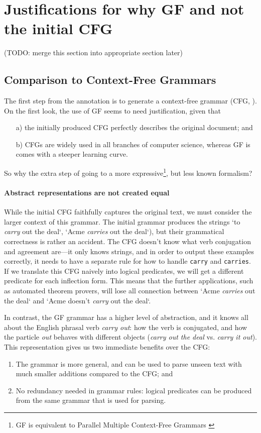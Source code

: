 \documentclass{IOS-Book-Article}
\begin{document}
\section{Justifications for why GF and not the initial CFG}

(TODO: merge this section into appropriate section later)

\subsection{Comparison to Context-Free Grammars}

The first step from the annotation is to generate a context-free grammar (CFG, \cite{chomsky-1956}). On the first look, the use of GF seems to need justification, given that
\begin{enumerate}
\item[a)] the initially produced CFG perfectly describes the original document; and
\item[b)] CFGs are widely used in all branches of computer science, whereas GF is comes with a steeper learning curve.
\end{enumerate}

So why the extra step of going to a more expressive\footnote{GF is equivalent to Parallel Multiple Context-Free Grammars \cite{seki-al-1991}}, but less known formalism?

\paragraph{Abstract representations are not created equal}
While the initial CFG faithfully captures the original text, we must consider the larger context of this grammar.
The initial grammar produces the strings `to \emph{carry} out the deal`, `Acme \emph{carries} out the deal`), but their grammatical correctness is rather an accident.
The CFG doesn't know what verb conjugation and agreement are---it only knows strings, and in order to output these examples correctly, it needs to have a separate rule for how to handle \texttt{carry} and \texttt{carries}. If we translate this CFG naively into logical predicates, we will get a different predicate for each inflection form. This means that the further applications, such as automated theorem provers, will lose all connection between `Acme \emph{carries} out the deal` and `Acme doesn't \emph{carry} out the deal`.

In contrast, the GF grammar has a higher level of abstraction, and it knows all about the English phrasal verb \emph{carry out}: how the verb is conjugated, and how the particle \emph{out} behaves with different objects (\emph{carry out the deal} vs. \emph{carry it out}). This representation gives us two immediate benefits over the CFG:
\begin{enumerate}
\item The grammar is more general, and can be used to parse unseen text with much smaller additions compared to the CFG; and
\item No redundancy needed in grammar rules: logical predicates can be produced from the same grammar that is used for parsing.
\end{enumerate}
\end{document}
